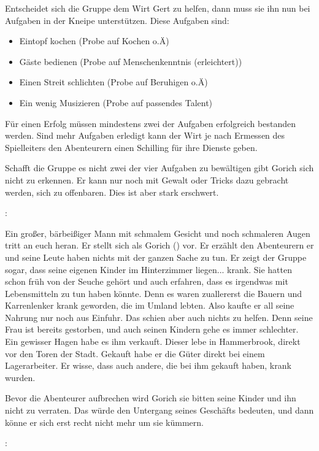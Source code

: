 Entscheidet sich die Gruppe dem Wirt Gert zu helfen, dann muss sie ihn nun bei Aufgaben in der Kneipe unterstützen. Diese Aufgaben sind:

\begin{itemize}
  \item Eintopf kochen (Probe auf Kochen o.Ä)
  \item Gäste bedienen (Probe auf Menschenkenntnis (erleichtert))
  \item Einen Streit schlichten (Probe auf Beruhigen o.Ä)
  \item Ein wenig Musizieren (Probe auf passendes Talent)
\end{itemize}

Für einen Erfolg müssen mindestens zwei der Aufgaben erfolgreich bestanden werden. Sind mehr Aufgaben erledigt kann der Wirt je nach Ermessen des Spielleiters den Abenteurern einen Schilling für ihre Dienste geben.

Schafft die Gruppe es nicht zwei der vier Aufgaben zu bewältigen gibt Gorich sich nicht zu erkennen. Er kann nur noch mit Gewalt oder Tricks dazu gebracht werden, sich zu offenbaren. Dies ist aber stark erschwert.

:

Ein großer, bärbeißiger Mann mit schmalem Gesicht und noch schmaleren Augen tritt an euch heran. Er stellt sich als Gorich (\blue{\ref{Gorich}}) vor. Er erzählt den Abenteurern er und seine Leute haben nichts mit der ganzen Sache zu tun. Er zeigt der Gruppe sogar, dass seine eigenen Kinder im Hinterzimmer liegen... krank. Sie hatten schon früh von der Seuche gehört und auch erfahren, dass es irgendwas mit Lebensmitteln zu tun haben könnte. Denn es waren zuallererst die Bauern und Karrenlenker krank geworden, die im Umland lebten. Also kaufte er all seine Nahrung nur noch aus Einfuhr. Das schien aber auch nichts zu helfen. Denn seine Frau ist bereits gestorben, und auch seinen Kindern gehe es immer schlechter. Ein gewisser Hagen habe es ihm verkauft. Dieser lebe in Hammerbrook, direkt vor den Toren der Stadt. Gekauft habe er die Güter direkt bei einem Lagerarbeiter. Er wisse, dass auch andere, die bei ihm gekauft haben, krank wurden.

Bevor die Abenteurer aufbrechen wird Gorich sie bitten seine Kinder und ihn nicht zu verraten. Das würde den Untergang seines Geschäfts bedeuten, und dann könne er sich erst recht nicht mehr um sie kümmern.

:


